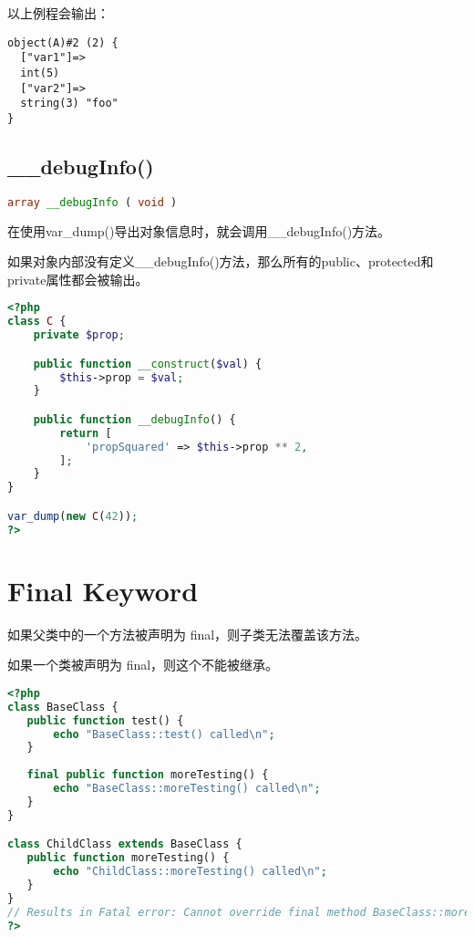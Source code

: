 以上例程会输出：

\begin{verbatim}
object(A)#2 (2) {
  ["var1"]=>
  int(5)
  ["var2"]=>
  string(3) "foo"
}
\end{verbatim}

\section{\_\_debugInfo()}



\begin{lstlisting}[language=PHP]
array __debugInfo ( void )
\end{lstlisting}

在使用var\_dump()导出对象信息时，就会调用\_\_debugInfo()方法。

如果对象内部没有定义\_\_debugInfo()方法，那么所有的public、protected和private属性都会被输出。

\begin{lstlisting}[language=PHP]
<?php
class C {
    private $prop;

    public function __construct($val) {
        $this->prop = $val;
    }

    public function __debugInfo() {
        return [
            'propSquared' => $this->prop ** 2,
        ];
    }
}

var_dump(new C(42));
?>
\end{lstlisting}


\chapter{Final Keyword}

\begin{compactitem}
\item 如果父类中的一个方法被声明为 final，则子类无法覆盖该方法。
\item 如果一个类被声明为 final，则这个不能被继承。
\end{compactitem}


\begin{lstlisting}[language=PHP]
<?php
class BaseClass {
   public function test() {
       echo "BaseClass::test() called\n";
   }
   
   final public function moreTesting() {
       echo "BaseClass::moreTesting() called\n";
   }
}

class ChildClass extends BaseClass {
   public function moreTesting() {
       echo "ChildClass::moreTesting() called\n";
   }
}
// Results in Fatal error: Cannot override final method BaseClass::moreTesting()
?>
\end{lstlisting}


